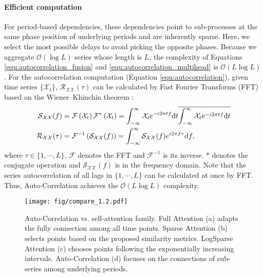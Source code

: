 \paragraph{Efficient computation} For period-based dependencies, these dependencies point to sub-processes at the same phase position of underlying periods and are inherently sparse. Here, we select the most possible delays to avoid picking the opposite phases. Because we aggregate $\mathcal{O}(\log L)$ series whose length is $L$, the complexity of Equations \ref{equ:autocorrelation_fusion} and \ref{equ:autocorrelation_multihead} is $\mathcal{O}(L\log L)$. For the autocorrelation computation (Equation \ref{equ:autocorrelation}), given time series $\{\mathcal{X}_t\}$, $\mathcal{R}_{\mathcal{X}\mathcal{X}}(\tau)$ can be calculated by Fast Fourier Transforms (FFT) based on the Wiener–Khinchin theorem \cite{MR1555316}:
\begin{equation}\label{equ:autocorrelation_algo}
  \begin{split}
  \mathcal{S}_{\mathcal{X}\mathcal{X}}(f) & = \mathcal{F}\left(\mathcal{X}_{t}\right)\mathcal{F}^\ast\left(\mathcal{X}_{t}\right) = \int_{-\infty}^{\infty}\mathcal{X}_{t}e^{-i2\pi tf}{\rm d}t\overline{\int_{-\infty}^{\infty}\mathcal{X}_{t}e^{-i2\pi tf}{\rm d}t} \\
  \mathcal{R}_{\mathcal{X}\mathcal{X}}(\tau) &= \mathcal{F}^{-1}\left(\mathcal{S}_{\mathcal{X}\mathcal{X}}(f)\right) = \int_{-\infty}^{\infty}\mathcal{S}_{\mathcal{X}\mathcal{X}}(f)e^{i2\pi f\tau}{\rm d}f, \\
  \end{split}
\end{equation}
where $\tau\in\{1,\cdots,L\}$, $\mathcal{F}$ denotes the FFT and $\mathcal{F}^{-1}$ is its inverse. $\ast$ denotes the conjugate operation and $\mathcal{S}_{\mathcal{X}\mathcal{X}}(f)$ is in the frequency domain. Note that the series autocorrelation of all lags in $\{1,\cdots,L\}$ can be calculated at once by FFT. Thus, Auto-Correlation achieves the $\mathcal{O}(L\log L)$ complexity.
\begin{figure*}
\begin{center}
	\centerline{\texttt{[image: fig/compare\_1.2.pdf]}}
	\vspace{-5pt}
	\caption{Auto-Correlation vs. self-attention family. Full Attention \cite{NIPS2017_3f5ee243} (a) adapts the fully connection among all time points. Sparse Attention \cite{kitaev2020reformer,haoyietal-informer-2021} (b) selects points based on the proposed similarity metrics. LogSparse Attention \cite{2019Enhancing} (c) chooses points following the exponentially increasing intervals. Auto-Correlation (d) focuses on the connections of sub-series among underlying periods.}
	\label{fig:compare}
	\vspace{-25pt}
\end{center}
\end{figure*}

